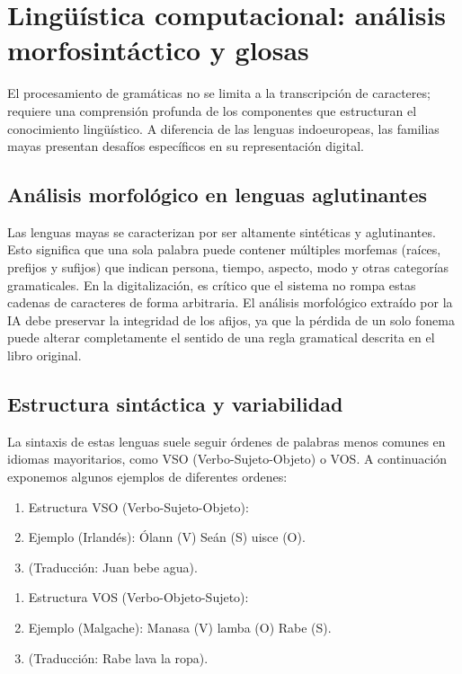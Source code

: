 \section{ Lingüística computacional: análisis morfosintáctico y glosas }
El procesamiento de gramáticas no se limita a la transcripción de caracteres; requiere una comprensión profunda de los componentes que estructuran el conocimiento lingüístico. A diferencia de las lenguas indoeuropeas, las familias mayas presentan desafíos específicos en su representación digital.

\subsection{ Análisis morfológico en lenguas aglutinantes }
Las lenguas mayas se caracterizan por ser altamente sintéticas y aglutinantes. Esto significa que una sola palabra puede contener múltiples morfemas (raíces, prefijos y sufijos) que indican persona, tiempo, aspecto, modo y otras categorías gramaticales.
En la digitalización, es crítico que el sistema no rompa estas cadenas de caracteres de forma arbitraria. El análisis morfológico extraído por la IA debe preservar la integridad de los afijos, ya que la pérdida de un solo fonema puede alterar completamente el sentido de una regla gramatical descrita en el libro original.

\subsection{ Estructura sintáctica y variabilidad }
La sintaxis de estas lenguas suele seguir órdenes de palabras menos comunes en idiomas mayoritarios, como VSO (Verbo-Sujeto-Objeto) o VOS. A continuación exponemos algunos ejemplos de diferentes ordenes:

\begin{enumerate}
    \item Estructura VSO (Verbo-Sujeto-Objeto):
    \item Ejemplo (Irlandés): Ólann (V) Seán (S) uisce (O).
    \item (Traducción: Juan bebe agua).
\end{enumerate}


\begin{enumerate}
    \item Estructura VOS (Verbo-Objeto-Sujeto):
    \item Ejemplo (Malgache): Manasa (V) lamba (O) Rabe (S).
    \item (Traducción: Rabe lava la ropa).
\end{enumerate}

